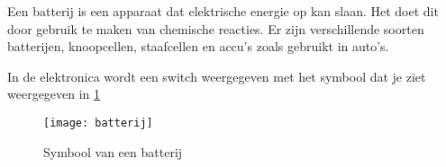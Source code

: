 Een batterij is een apparaat dat elektrische energie op kan slaan. Het doet dit door gebruik te maken van chemische reacties. Er zijn verschillende soorten batterijen, knoopcellen, staafcellen en accu's zoals gebruikt in auto's.

In de elektronica wordt een switch weergegeven met het symbool dat je ziet weergegeven in \ref{symbool:battery}

\begin{figure}[h]
\texttt{[image: batterij]}
\centering
\caption{Symbool van een batterij}
\label{symbool:battery}
\end{figure}

